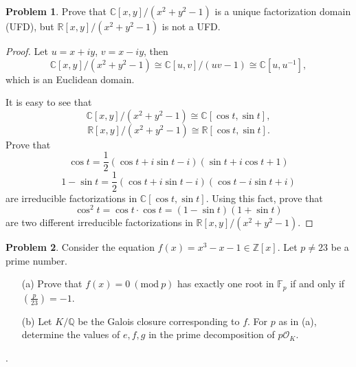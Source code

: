 \documentclass[a4paper,12pt,leqno]{article}
\theoremstyle{definition}
\newtheorem{prob}{Problem}
\newcommand{\legendre}[2]{\genfrac{(}{)}{}{}{#1}{#2}}
\begin{document}
 
\begin{prob}
Prove that $\mathbb{C}[x,y]/(x^2+y^2-1)$ is a unique factorization domain (UFD), but $\mathbb{R}[x,y]/(x^2+y^2-1)$ is not a UFD.
\end{prob}
\begin{proof}
Let $u=x+iy$, $v=x-iy$, then \[\mathbb{C}[x,y]/(x^2+y^2-1)\cong \mathbb{C}[u,v]/(uv-1)\cong \mathbb{C}[u,u^{-1}],\]
which is an Euclidean domain.

It is easy to see that \[\mathbb{C}[x,y]/(x^2+y^2-1)\cong \mathbb{C}[\cos t,\sin t],\]
\[\mathbb{R}[x,y]/(x^2+y^2-1)\cong\mathbb{R}[\cos t,\sin t].\]
Prove that 
\[\cos t=\frac{1}{2}(\cos t+i \sin t-i)(\sin t+i \cos t+1)\]
\[1-\sin t=\frac{1}{2}(\cos t+i \sin t-i)(\cos t-i \sin t+i)\]
are irreducible factorizations in $\mathbb{C}[\cos t,\sin t]$. Using this fact, prove that  
\[\cos^2t=\cos t\cdot \cos t=(1-\sin t)(1+\sin t)\]
are two different irreducible factorizations in $\mathbb{R}[x,y]/(x^2+y^2-1)$. 
\end{proof}
 
 \medskip

\begin{prob}
Consider the equation $f(x)=x^3-x-1\in \mathbb{Z}[x]$. Let $p\neq 23$ be a prime number.

\begin{itemize}
\item[(a)] Prove that $f(x)=0\ (\mathrm{mod}\ p)$ has exactly one root in $\mathbb{F}_p$ if and only if $\legendre{p}{23}=-1$. 

\item[(b)] Let $K/\mathbb{Q}$ be the Galois closure corresponding to $f$. For $p$ as in (a), determine the values of $e,f,g$ in the prime decomposition of $p\mathcal{O}_K$.  
\end{itemize}.
\end{prob}
\end{document}
